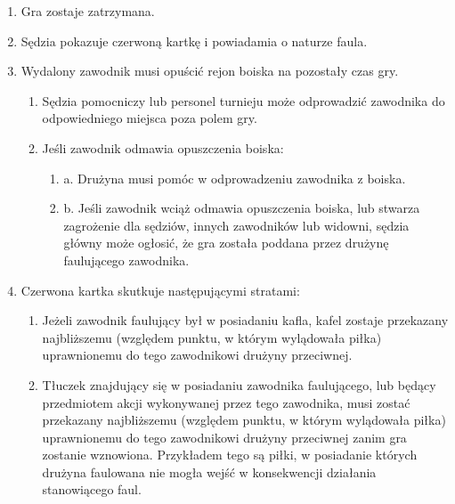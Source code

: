 \documentclass[12pt]{article}
\begin{document}
\begin{enumerate}
	\item
	      Gra zostaje zatrzymana.
	\item
	      Sędzia pokazuje czerwoną kartkę i powiadamia o naturze faula.
	\item
	      Wydalony zawodnik musi opuścić rejon boiska na pozostały czas gry.

	      \begin{enumerate}
		      \item
		            Sędzia pomocniczy lub personel turnieju może odprowadzić zawodnika
		            do odpowiedniego miejsca poza polem gry.
		      \item
		            Jeśli zawodnik odmawia opuszczenia boiska:

		            \begin{enumerate}
			            \item
			                  a. Drużyna musi pomóc w odprowadzeniu zawodnika z boiska.
			            \item
			                  b. Jeśli zawodnik wciąż odmawia opuszczenia boiska, lub stwarza
			                  zagrożenie dla sędziów, innych zawodników lub widowni, sędzia
			                  główny może ogłosić, że gra została poddana przez drużynę
			                  faulującego zawodnika.
		            \end{enumerate}
	      \end{enumerate}
	\item
	      Czerwona kartka skutkuje następującymi stratami:

	      \begin{enumerate}
		      \item
		            Jeżeli zawodnik faulujący był w posiadaniu kafla, kafel zostaje
		            przekazany najbliższemu (względem punktu, w którym wylądowała piłka)
		            uprawnionemu do tego zawodnikowi drużyny przeciwnej.
		      \item
		            Tłuczek znajdujący się w posiadaniu zawodnika faulującego, lub
		            będący przedmiotem akcji wykonywanej przez tego zawodnika, musi
		            zostać przekazany najbliższemu (względem punktu, w którym wylądowała
		            piłka) uprawnionemu do tego zawodnikowi drużyny przeciwnej zanim gra
		            zostanie wznowiona. Przykładem tego są piłki, w posiadanie których
		            drużyna faulowana nie mogła wejść w konsekwencji działania
		            stanowiącego faul.


\end{enumerate}
\end{enumerate}
\end{document}
